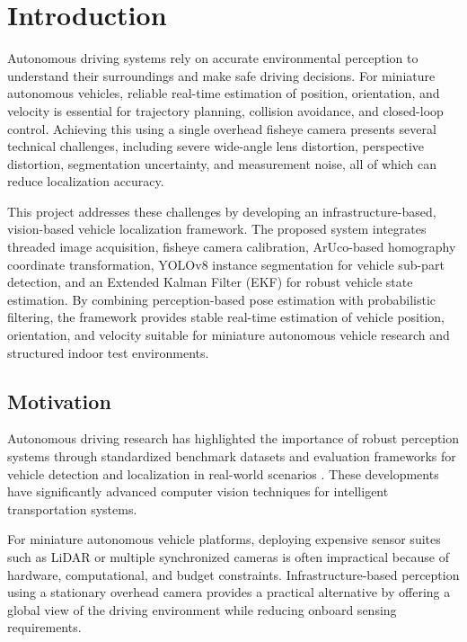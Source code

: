 \chapter{Introduction}
\label{Chapter1}

Autonomous driving systems rely on accurate environmental perception to understand their surroundings and make safe driving decisions. For miniature autonomous vehicles, reliable real-time estimation of position, orientation, and velocity is essential for trajectory planning, collision avoidance, and closed-loop control. Achieving this using a single overhead fisheye camera presents several technical challenges, including severe wide-angle lens distortion, perspective distortion, segmentation uncertainty, and measurement noise, all of which can reduce localization accuracy.

This project addresses these challenges by developing an infrastructure-based, vision-based vehicle localization framework. The proposed system integrates threaded image acquisition, fisheye camera calibration, ArUco-based homography coordinate transformation, YOLOv8 instance segmentation for vehicle sub-part detection, and an Extended Kalman Filter (EKF) for robust vehicle state estimation. By combining perception-based pose estimation with probabilistic filtering, the framework provides stable real-time estimation of vehicle position, orientation, and velocity suitable for miniature autonomous vehicle research and structured indoor test environments.


\section{Motivation}

Autonomous driving research has highlighted the importance of robust perception systems through standardized benchmark datasets and evaluation frameworks for vehicle detection and localization in real-world scenarios \cite{geiger2012kitti}. These developments have significantly advanced computer vision techniques for intelligent transportation systems.

For miniature autonomous vehicle platforms, deploying expensive sensor suites such as LiDAR or multiple synchronized cameras is often impractical because of hardware, computational, and budget constraints. Infrastructure-based perception using a stationary overhead camera provides a practical alternative by offering a global view of the driving environment while reducing onboard sensing requirements.%

